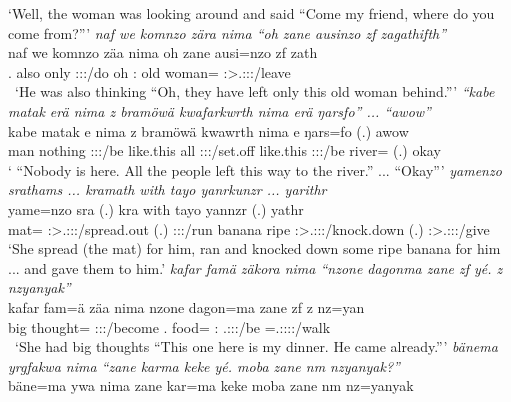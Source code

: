 \begin{exe}
	\trans `Well, the woman was looking around and said ``Come my friend, where do you come from?''{}'
\newpage 
{}
	\emph{naf we komnzo zära nima ``oh zane ausinzo zf zagathifth''}\\
	\gll naf we komnzo zäa nima oh zane ausi=nzo zf zath\\
	\Tsg.{\Erg} also only \Stsg:\Sbj:\Pst:\Pfv/do {\Quot} oh \Dem:{\Prox} {old woman}={\Only} {\Imm} \Stpl:\Sbj>\Tsg.\F:\Obj:\Rpst:\Pfv/leave\\\
	\trans `He was also thinking ``Oh, they have left only this old woman behind.'''
\exi{36}
	\emph{``kabe matak erä nima z bramöwä kwafarkwrth nima erä ŋarsfo'' ... ``awow''}\\
	\gll kabe matak e nima z bramöwä kwa\stem{fark}wrth nima e\stem{rä} ŋars=fo (.) awow\\
	man nothing \Stpl:\Sbj:\Nonpast:\Ipfv/be {like.this} {\Iam} all \Stpl:\Sbj:\Pst:\Ipfv/set.off {like.this} \Stpl:\Sbj:\Nonpast:\Ipfv/be river={\All} (.) okay\\
	\trans ` ``Nobody is here. All the people left this way to the river.'' ... ``Okay'''
\exi{37}
	\emph{yamenzo srathams ... kramath with tayo yanrkunzr ... yarithr}\\
	\gll yame=nzo sra\stem{thams} (.) kra\stem{math} with tayo yannzr (.) yathr\\
	mat={\Only} \Stsg:\Sbj>\Tsg.\Masc:\Io:\Irr:\Pfv/spread.out (.) \Stsg:\Sbj:\Irr:\Pfv/run banana ripe \Stsg:\Sbj>\Tsg.\Masc:\Io:\Nonpast:\Ipfv/knock.down (.) \Stsg:\Sbj>\Tsg.\Masc:\Io:\Nonpast:\Ipfv/give\\
	\trans `She spread (the mat) for him, ran and knocked down some ripe banana for him ... and gave them to him.'
\exi{38}
	\emph{kafar famä zäkora nima ``nzone dagonma zane zf yé. z nzyanyak''}\\
	\gll kafar fam=ä zä\stem{kor}a nima nzone dagon=ma zane zf \stem{yé} z nz=yan\\
	big thought={\Assoc} \Stsg:\Sbj:\Pst:\Pfv/become {\Quot} \Fsg.{\Poss} food={\Char} \Dem:{\Prox} {\Imm} \Tsg.\Masc:\Sbj:\Nonpast:\Ipfv/be {\Iam} \Immpst=\Tsg.\Masc:\Sbj:\Nonpast:\Ipfv:\Venit/walk\\\
	\trans `She had big thoughts ``This one here is my dinner. He came already.'''
\exi{39}
	\emph{bänema yrgfakwa nima ``zane karma keke yé. moba zane nm nzyanyak?''}\\
	\gll bäne=ma ywa nima zane kar=ma keke  moba zane nm nz=yanyak\\

\end{exe}
